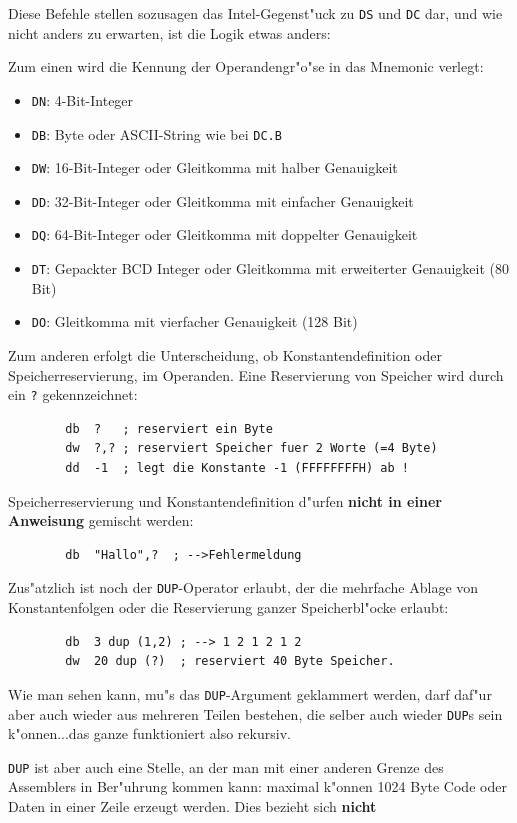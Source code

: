 \documentclass[12pt,a4paper,twoside]{report}
\makeatletter
\newcommand{\bb}[1]{{\bf #1}}
\newcommand{\tty}[1]{{\tt #1}}
\newcommand{\ttindex}[1]{\index{#1@{\tt #1}}}
\makeatother
\begin{document}
Diese Befehle stellen sozusagen das Intel-Gegenst"uck zu \tty{DS}
und \tty{DC} dar, und wie nicht anders zu erwarten, ist die Logik
etwas anders:
\par
Zum einen wird die Kennung der Operandengr"o"se in das Mnemonic
verlegt:
\begin{itemize}
\item{\tty{DN}: 4-Bit-Integer}
\item{\tty{DB}: Byte oder ASCII-String wie bei \tty{DC.B}}
\item{\tty{DW}: 16-Bit-Integer oder Gleitkomma mit halber Genauigkeit}
\item{\tty{DD}: 32-Bit-Integer oder Gleitkomma mit einfacher Genauigkeit}
\item{\tty{DQ}: 64-Bit-Integer oder Gleitkomma mit doppelter Genauigkeit}
\item{\tty{DT}: Gepackter BCD Integer oder Gleitkomma mit erweiterter Genauigkeit (80 Bit)}
\item{\tty{DO}: Gleitkomma mit vierfacher Genauigkeit (128 Bit)}
\end{itemize}
Zum anderen erfolgt die Unterscheidung, ob Konstantendefinition oder
Speicherreservierung, im Operanden.  Eine Reservierung von Speicher
wird durch ein \tty{?} gekennzeichnet:
\begin{verbatim}
        db  ?   ; reserviert ein Byte
        dw  ?,? ; reserviert Speicher fuer 2 Worte (=4 Byte)
        dd  -1  ; legt die Konstante -1 (FFFFFFFFH) ab !
\end{verbatim}
Speicherreservierung und Konstantendefinition d"urfen \bb{nicht in einer
Anweisung} gemischt werden:
\begin{verbatim}
        db  "Hallo",?  ; -->Fehlermeldung
\end{verbatim}
\ttindex{DUP}
Zus"atzlich ist noch der \tty{DUP}-Operator erlaubt, der die mehrfache Ablage
von Konstantenfolgen oder die Reservierung ganzer Speicherbl"ocke erlaubt:
\begin{verbatim}
        db  3 dup (1,2) ; --> 1 2 1 2 1 2
        dw  20 dup (?)  ; reserviert 40 Byte Speicher.
\end{verbatim}
Wie man sehen kann, mu"s das \tty{DUP}-Argument geklammert werden, darf daf"ur
aber auch wieder aus mehreren Teilen bestehen, die selber auch wieder
\tty{DUP}s sein k"onnen...das ganze funktioniert also rekursiv.
\par
\tty{DUP} ist aber auch eine Stelle, an der man mit einer anderen Grenze des
Assemblers in Ber"uhrung kommen kann: maximal k"onnen 1024 Byte Code
oder Daten in einer Zeile erzeugt werden.  Dies bezieht sich \bb{nicht}
\end{document}
